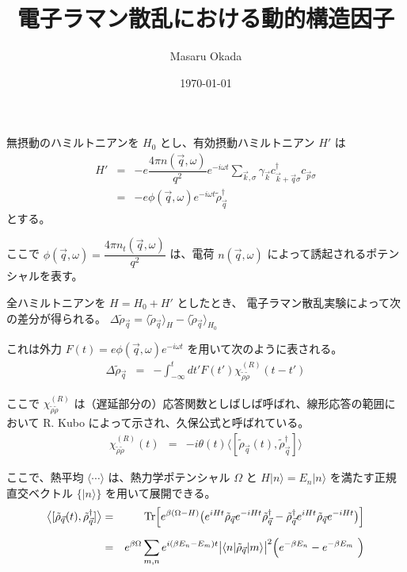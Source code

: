 \documentclass[uplatex,a4j,12pt,dvipdfmx]{jsarticle}
\title{
電子ラマン散乱における動的構造因子
}
\author{Masaru Okada}
\date{\today}
\begin{document}
\maketitle

\thispagestyle{empty}
無摂動のハミルトニアンを $H_{0}$ とし、有効摂動ハミルトニアン $H'$ は
\begin{eqnarray}
	H'
	&=&
	-e \dfrac{ 4 \pi n ( \vec{q} , \omega ) }{ q^{2} }
	e^{- i \omega t}
	\sum_{\vec{k},\sigma}
	\gamma_{\vec{k}}
	c^{\dagger}_{\vec{k}+\vec{q} \sigma} c_{\vec{p} \sigma}
	\nonumber \\ &=&
	- e \phi(\vec{q},\omega) e^{- i \omega t} \tilde{\rho}^{\dagger}_{\vec{q}}
\end{eqnarray}
とする。

ここで
$\phi(\vec{q},\omega) = \dfrac{ 4 \pi n_{t} ( \vec{q} , \omega ) }{ q^{2} }$
は、電荷
$n ( \vec{q} , \omega )$
によって誘起されるポテンシャルを表す。

全ハミルトニアンを $H=H_{0}+H'$ としたとき、
電子ラマン散乱実験によって次の差分が得られる。
$\Delta \tilde{\rho}_{\vec{q}} = \langle \tilde{\rho}_{\vec{q}} \rangle_{H} - \langle \tilde{\rho}_{\vec{q}} \rangle_{H_{0}}$


これは外力
$F(t) = e \phi(\vec{q},\omega) e^{- i \omega t}$
を用いて次のように表される。
\begin{eqnarray}
	\Delta \tilde{\rho}_{\vec{q}}
	&=&
	- \int^{t}_{-\infty} dt' F(t') \chi^{(R)}_{\tilde{\rho} \tilde{\rho}}(t - t')
\end{eqnarray}


ここで
$\chi^{(R)}_{\tilde{\rho} \tilde{\rho}}$
は（遅延部分の）応答関数としばしば呼ばれ、線形応答の範囲において R. Kubo によって示され、久保公式と呼ばれている。
\begin{eqnarray}
	\chi^{(R)}_{\tilde{\rho} \tilde{\rho}}(t)
	&=&
	- i \theta(t) \big\langle [ \tilde{\rho}_{\vec{q}}(t) , \tilde{\rho}_{\vec{q}}^{\dagger} ] \big\rangle
\end{eqnarray}


ここで、熱平均 $\langle \cdots \rangle$ は、熱力学ポテンシャル $\Omega$
と $H | n \rangle = E_{n} | n \rangle$ を満たす正規直交ベクトル $\big\{ | n \rangle \big\}$ を用いて展開できる。
\begin{eqnarray}
	\big\langle [ \tilde{\rho}_{\vec{q}}(t) , \tilde{\rho}_{\vec{q}}^{\dagger} ] \big\rangle
	&=&
	{\rm Tr}
	\Big[ e^{\beta ( \Omega - H ) }
		\big(
		e^{i H t} \tilde{\rho}_{\vec{q}} e^{-iHt} \tilde{\rho}_{\vec{q}}^{\dagger}
		-
		\tilde{\rho}_{\vec{q}}^{\dagger} e^{i H t} \tilde{\rho}_{\vec{q}} e^{-iHt}
		\big) \Big]
	\nonumber \\[2mm] &=&
	e^{\beta \Omega}
	\sum_{m,n} e^{i ( \beta E_{n} - E_{m} ) t }
	\big| \langle n | \tilde{\rho}_{\vec{q}} | m \rangle \big|^{2} \Big( e^{- \beta E_{n}} - e^{- \beta E_{m}}  \Big)
\end{eqnarray}
\end{document}
